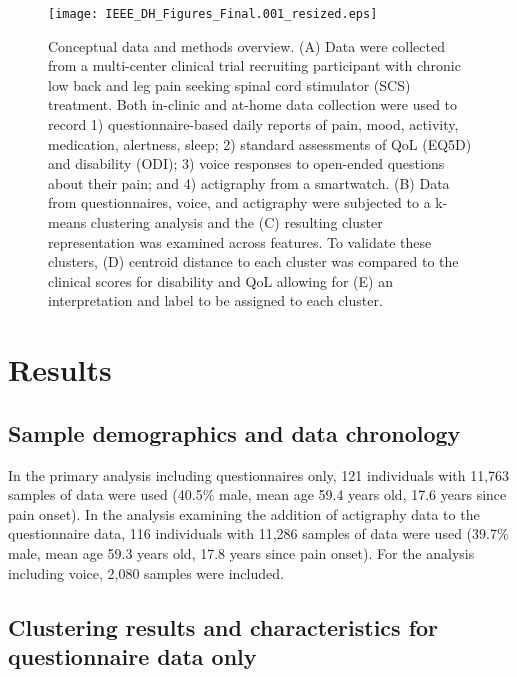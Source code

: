 \documentclass[conference]{IEEEtran}
\begin{document}
\begin{figure}[htbp]
\centerline{\texttt{[image: IEEE\_DH\_Figures\_Final.001\_resized.eps]}}
\caption{Conceptual data and methods overview. (A) Data were collected from a multi-center clinical trial recruiting participant with chronic low back and leg pain seeking spinal cord stimulator (SCS) treatment. Both in-clinic and at-home data collection were used to record 1) questionnaire-based daily reports of pain, mood, activity, medication, alertness, sleep; 2) standard assessments of QoL (EQ5D) and disability (ODI); 3) voice responses to open-ended questions about their pain; and 4) actigraphy from a smartwatch. (B) Data from questionnaires, voice, and actigraphy were subjected to a k-means clustering analysis and the (C) resulting cluster representation was examined across features. To validate these clusters, (D) centroid distance to each cluster was compared to the clinical scores for disability and QoL allowing for (E) an interpretation and label to be assigned to each cluster. }
\label{fig}
\end{figure}

\section{Results}

\subsection{Sample demographics and data chronology} 

In the primary analysis including questionnaires only, 121 individuals with 11,763 samples of data were used (40.5\% male, mean age 59.4 years old, 17.6 years since pain onset). In the analysis examining the addition of actigraphy data to the questionnaire data, 116 individuals with 11,286 samples of data were used (39.7\% male, mean age 59.3 years old, 17.8 years since pain onset). For the analysis including voice, 2,080 samples were included. 

\subsection{Clustering results and characteristics for questionnaire data only}
\end{document}
